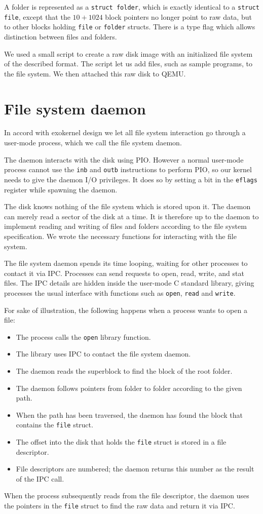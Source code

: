 \documentclass{report}
\begin{document}
A folder is represented as a \texttt{struct folder}, which is exactly
identical to a \texttt{struct file}, except that the $10+1024$ block pointers
no longer point to raw data, but to other blocks holding \texttt{file} or
\texttt{folder} structs. There is a type flag which allows distinction between
files and folders.

We used a small script to create a raw disk image with an initialized file
system of the described format. The script let us add files, such as sample
programs, to the file system. We then attached this raw disk to QEMU.



\section{File system daemon}
In accord with exokernel design we let all file system interaction go through
a user-mode process, which we call the file system daemon.

The daemon interacts with the disk using PIO. However a normal user-mode
process cannot use the \texttt{inb} and \texttt{outb} instructions to perform
PIO, so our kernel needs to give the daemon I/O privileges. It does so
by setting a bit in the \texttt{eflags} register while spawning the daemon.

The disk knows nothing of the file system which is stored upon it. The daemon
can merely read a sector of the disk at a time. It is therefore up to the
daemon to implement reading and writing of files and folders according to the
file system specification. We wrote the necessary functions for interacting
with the file system.

The file system daemon spends its time looping, waiting for other processes to
contact it via IPC. Processes can send requests to open, read, write,
and stat files. The IPC details are hidden inside the user-mode C standard
library, giving processes the usual interface with functions such as
\texttt{open}, \texttt{read} and \texttt{write}.

For sake of illustration, the following happens when a process wants to open a
file:
\begin{itemize}
\item The process calls the \texttt{open} library function.
\item The library uses IPC to contact the file system daemon.
\item The daemon reads the superblock to find the block of the root folder.
\item The daemon follows pointers from folder to folder according to the given
path.
\item When the path has been traversed, the daemon has found the block that
contains the \texttt{file} struct.
\item The offset into the disk that holds the \texttt{file} struct is stored
in a file descriptor.
\item File descriptors are numbered; the daemon returns this number as the
result of the IPC call.
\end{itemize}
When the process subsequently reads from the file descriptor, the daemon
uses the pointers in the \texttt{file} struct to find the raw data and return
it via IPC.
\end{document}
